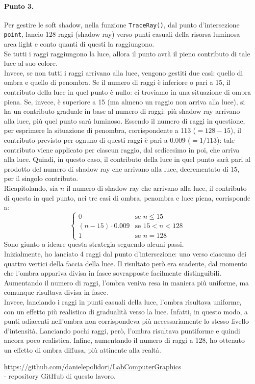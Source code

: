 \documentclass[a4paper, 12pt]{article}
\begin{document}
\paragraph{Punto 3.}
Per gestire le soft shadow, nella funzione \texttt{TraceRay()}, dal punto d'intersezione \texttt{point}, lancio 128 raggi (shadow ray) verso punti casuali della risorsa luminosa area light e conto quanti di questi la raggiungono.\\
Se tutti i raggi raggiungono la luce, allora il punto avrà il pieno contributo di tale luce al suo colore.\\
Invece, se non tutti i raggi arrivano alla luce, vengono gestiti due casi: quello di ombra e quello di penombra. Se il numero di raggi è inferiore o pari a 15, il contributo della luce in quel punto è nullo: ci troviamo in una situazione di ombra piena. Se, invece, è superiore a 15 (ma almeno un raggio non arriva alla luce), si ha un contributo graduale in base al numero di raggi: più shadow ray arrivano alla luce, più quel punto sarà luminoso. Essendo il numero di raggi in questione, per esprimere la situazione di penombra, corrispondente a 113 ($= 128-15$), il contributo previsto per ognuno di questi raggi è pari a $0.009$ ($= 1/113$): tale contributo viene applicato per ciascun raggio, dal sedicesimo in poi, che arriva alla luce. Quindi, in questo caso, il contributo della luce in quel punto sarà pari al prodotto del numero di shadow ray che arrivano alla luce, decrementato di 15, per il singolo contributo.\\
Ricapitolando, sia $n$ il numero di shadow ray che arrivano alla luce, il contributo di questa in quel punto, nei tre casi di ombra, penombra e luce piena, corrisponde a:
\[
  \begin{cases}
    0                     & \text{se $n \leq 15$}     \\
    (n - 15) \cdot 0.009  & \text{se $15 < n < 128$}  \\
    1                     & \text{se $n = 128$}
  \end{cases}
\]
Sono giunto a ideare questa strategia seguendo alcuni passi.\\
Inizialmente, ho lanciato 4 raggi dal punto d'intersezione: uno verso ciascuno dei quattro vertici della faccia della luce. Il risultato però era scadente, dal momento che l'ombra appariva divisa in fasce sovrapposte facilmente distinguibili. Aumentando il numero di raggi, l'ombra veniva resa in maniera più uniforme, ma comunque risultava divisa in fasce.\\
Invece, lanciando i raggi in punti casuali della luce, l'ombra risultava uniforme, con un effetto più realistico di gradualità verso la luce. Infatti, in questo modo, a punti adiacenti nell'ombra non corrispondeva più necessariamente lo stesso livello d'intensità. Lanciando pochi raggi, però, l'ombra risultava puntiforme e quindi ancora poco realistica. Infine, aumentando il numero di raggi a 128, ho ottenuto un effetto di ombra diffusa, più attinente alla realtà.


\begin{thebibliography}{90}
 \url{https://github.com/danielepolidori/LabComputerGraphics}\\
- repository GitHub di questo lavoro.
\end{thebibliography}
\end{document}
